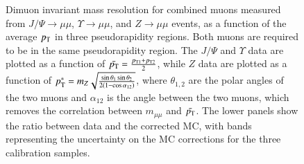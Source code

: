 \begin{figure}[htbp]
{		
	}
	\caption{Dimuon invariant mass resolution for combined muons measured from $J/\Psi\rightarrow\mu\mu$, $\Upsilon\rightarrow\mu\mu$, and $Z\rightarrow\mu\mu$ events, as a function of the average $p_{\text{T}}$ in three pseudorapidity regions. Both muons are required to be in the same pseudorapidity region. The $J/\Psi$ and $\Upsilon$ data are plotted as a function of $\bar{p_{\text{T}}}=\frac{p_{\mathrm{T}1}+p_{\mathrm{T}2}}{2}$, while $Z$ data are plotted as a function of $p_{\text{T}}^*=m_{Z}\sqrt{\frac{\sin\theta_1\sin\theta_2}{2(1-\cos\alpha_{12})}}$, where $\theta_{1,2}$ are the polar angles of the two muons and $\alpha_{12}$ is the angle between the two muons, which removes the correlation between $m_{\mu\mu}$ and $\bar{p_{\text{T}}}$.  The lower panels show the ratio between data and the corrected MC, with bands representing the uncertainty on the MC corrections for the three calibration samples.}
	\label{fig:reco-muon-resolution}
\end{figure}


